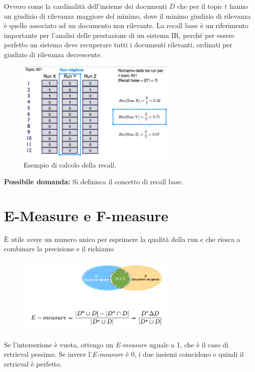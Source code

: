 \noindent Ovvero come la cardinalità dell'insieme dei documenti $D$ che per il topic $t$ hanno un giudizio di rilevanza maggiore del minimo, dove il minimo giudizio di rilevanza è quello associato ad un documento non rilevante.
La recall base è un riferimento importante per l'analisi delle prestazione di un sistema IR, perché per essere perfetto un sistema deve recuperare tutti i documenti rilevanti, ordinati per giudizio di rilevanza decrescente.

\begin{figure}[htbp]
	\centering
	\includegraphics[width=0.7\textwidth]{images/l15-fig-2.png}
	\caption{Esempio di calcolo della recall.}
\end{figure}

\textbf{{\color{Red} Possibile domanda:}} Si definisca il concetto di recall base.
\FloatBarrier
\section{E-Measure e F-measure}

\`E utile avere un numero unico per esprimere la qualità della run e che riesca a combinare la precisione e il richiamo

\begin{figure}[htbp]
	\centering
	\includegraphics[width=0.7\textwidth]{images/l15-fig-3.png}
\end{figure}

Se l'intersezione è vuota, ottengo un \textit{E-measure} uguale a 1, che è il caso di retrieval pessimo.
Se invece l'\textit{E-measure} è 0, i due insiemi coincidono e quindi il retrieval è perfetto.

